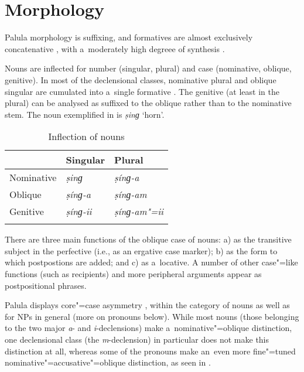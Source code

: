 \section{Morphology}
\label{sec:2-2}

Palula morphology is suffixing, and formatives are almost exclusively concatenative \citep{bickel_fusion_2013}, with a~moderately high degreee of synthesis \citep{bickel_inflectional_2013}. 


Nouns are inflected for number (singular, plural) and case (nominative, oblique, genitive). In most of the declensional classes, nominative plural and oblique singular are cumulated into a~single formative \citep{bickel_exponence_2013}. The genitive (at least in the plural) can be analysed as suffixed to the oblique rather than to the nominative stem. The noun exemplified in  is \textit{ṣinɡ} `horn'.

\begin{table}[ht]
\caption{Inflection of nouns}
\begin{tabularx}{\textwidth}{ Q Q Q }
\lsptoprule
&
Singular &
Plural
\\\hline
Nominative &
\textit{ṣinɡ} &
\textit{ṣínɡ-a}\\
Oblique &
\textit{ṣínɡ-a} &
\textit{ṣínɡ-am}\\ 
Genitive &
\textit{ṣínɡ-ii} &
\textit{ṣínɡ-am"=ii}
\\\lspbottomrule
\end{tabularx}
\label{tab:2-nouns}
\end{table}


There are three main functions of the oblique case of nouns: a) as the transitive subject in the perfective (i.e., as an ergative case marker); b) as the form to which postpostions are added; and c) as a~locative. A number of other case"=like functions (such as recipients) and more peripheral arguments appear as postpositional phrases.


Palula displays core"=case asymmetry \citep{iggesen_asymmetrical_2013}, within the category of nouns as well as for NPs in general (more on pronouns below). While most nouns (those belonging to the two major \textit{a}- and \textit{i}-declensions) make a~nominative"=oblique distinction, one declensional class (the \textit{m}-declension) in particular does not make this distinction at all, whereas some of the pronouns make an~even more fine"=tuned nominative"=accusative"=oblique distinction, as seen in .


